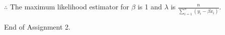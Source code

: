 \documentclass[12pt]{article}
\begin{document}
\begin{enumerate}[1.]
\begin{enumerate}
                $\therefore$ The maximum likelihood estimator for $\beta$ is 1 and $\lambda$ is $\frac{n}{\sum_{i=1}^{n} (y_i - \beta x_i)}$.
                
        \end{enumerate}
    
\end{enumerate}
End of Assignment 2.
\end{document}
